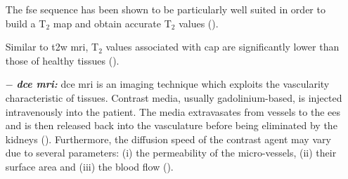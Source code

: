 \begin{enumerate}[leftmargin=*]
%
%
%
%

The \Ac{fse} sequence has been shown to be particularly well suited in order to build a T$_2$ map and obtain accurate T$_2$ values (\cite{Liney1996a}).

Similar to \ac{t2w} \ac{mri}, T$_2$ values associated with \ac{cap} are significantly lower than those of healthy tissues (\cite{Liney1996,Gibbs2001}).

\item[$-$] \textbf{\textit{\ac{dce} \ac{mri}:}} \ac{dce} \ac{mri} is an imaging technique which exploits the vascularity characteristic of tissues. Contrast media, usually gadolinium-based, is injected intravenously into the patient. The media extravasates from vessels to the \ac{ees} and is then released back into the vasculature before being eliminated by the kidneys (\cite{Gribbestad2005}). Furthermore, the diffusion speed of the contrast agent may vary due to several parameters: (i) the permeability of the micro-vessels, (ii) their surface area and (iii) the blood flow (\cite{Padhani2002}).



\end{enumerate}

